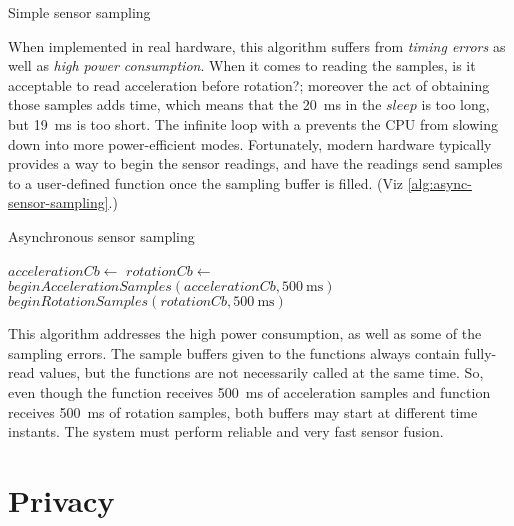 \begin{algorithm}
  \caption{Simple sensor sampling}
  \label{alg:naive-sensor-sampling}
  \DontPrintSemicolon
\end{algorithm} 

When implemented in real hardware, this algorithm suffers from \emph{timing errors} as well as \emph{high power consumption}. When it comes to reading the samples, is it acceptable to read acceleration before rotation?; moreover the act of obtaining those samples adds time, which means that the \SI{20}{\milli\second} in the $sleep$ is too long, but \SI{19}{\milli\second} is too short. The infinite loop with a  prevents the CPU from slowing down into more power-efficient modes. Fortunately, modern hardware typically provides a way to begin the sensor readings, and have the readings send samples to a user-defined function once the sampling buffer is filled. (Viz \autoref{alg:async-sensor-sampling}.)

\begin{algorithm}
  \caption{Asynchronous sensor sampling}
  \label{alg:async-sensor-sampling}
  \DontPrintSemicolon
  $accelerationCb \leftarrow$ \;
  $rotationCb \leftarrow$ \;
  $beginAccelerationSamples(accelerationCb, \SI{500}{\milli\second})$\;
  $beginRotationSamples(rotationCb, \SI{500}{\milli\second})$\;
\end{algorithm} 

This algorithm addresses the high power consumption, as well as some of the sampling errors. The sample buffers given to the functions  always contain fully-read values, but the functions are not necessarily called at the same time. So, even though the  function receives \SI{500}{\milli\second} of acceleration samples and  function receives \SI{500}{\milli\second} of rotation samples, both buffers may start at different time instants. The system must perform reliable and very fast sensor fusion.

\section{Privacy}

\printbibliography

 